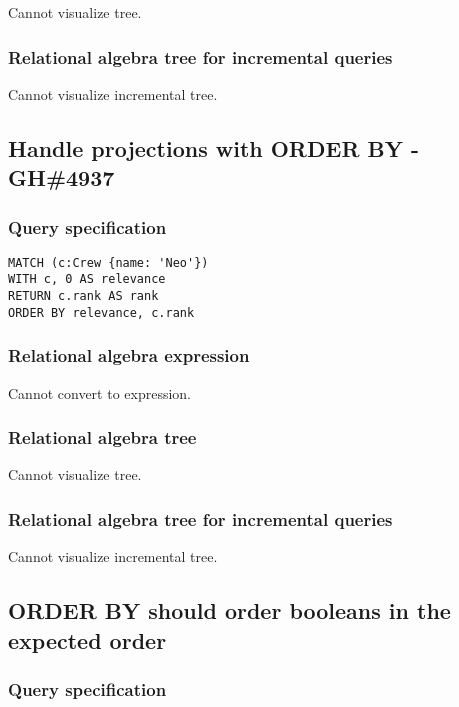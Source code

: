 Cannot visualize tree.

\subsubsection*{Relational algebra tree for incremental queries}

Cannot visualize incremental tree.

\subsection{Handle projections with ORDER BY - GH\#4937}

\subsubsection*{Query specification}

\begin{lstlisting}
MATCH (c:Crew {name: 'Neo'})
WITH c, 0 AS relevance
RETURN c.rank AS rank
ORDER BY relevance, c.rank
\end{lstlisting}

\subsubsection*{Relational algebra expression}

Cannot convert to expression.

\subsubsection*{Relational algebra tree}

Cannot visualize tree.

\subsubsection*{Relational algebra tree for incremental queries}

Cannot visualize incremental tree.

\subsection{ORDER BY should order booleans in the expected order}

\subsubsection*{Query specification}

